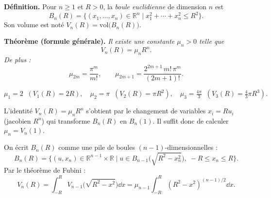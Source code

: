 ﻿%



\begin{tcolorbox}[thmbox]
  \textbf{Définition.}\enspace{}
  Pour $n \geq 1$ et $R > 0$, la \emph{boule euclidienne} de dimension $n$ est
  \[
    B_n(R) = \bigl\{(x_1,\ldots,x_n)\in\mathbb{R}^n \;\big|\; x_1^2+\cdots+x_n^2 \leq R^2\bigr\}.
  \]
  Son volume est noté $V_n(R) = \mathrm{vol}\bigl(B_n(R)\bigr)$.

  \medskip
  \textbf{Théorème (formule générale).}\enspace%
  \textit{Il existe une constante $\mu_n > 0$ telle que}
  \[
    V_n(R) = \mu_n R^n.
  \]
  \textit{De plus :}
  \[
    \mu_{2m} = \frac{\pi^m}{m!}, \qquad
    \mu_{2m+1} = \frac{2^{2m+1}\,m!\,\pi^m}{(2m+1)!}.
  \]
\end{tcolorbox}

\[
  \mu_1 = 2 \;\;(V_1(R)=2R),\quad
  \mu_2 = \pi \;\;(V_2(R)=\pi R^2),\quad
  \mu_3 = \tfrac{4\pi}{3} \;\;(V_3(R)=\tfrac{4}{3}\pi R^3).
\]

L'identité $V_n(R) = \mu_n R^n$ s'obtient par le changement de variables
$x_i = R u_i$ (jacobien $R^n$) qui transforme $B_n(R)$ en $B_n(1)$.
Il suffit donc de calculer $\mu_n = V_n(1)$.

\decsep{}


On écrit $B_n(R)$ comme une pile de boules $(n{-}1)$-di\-men\-sion\-nelles :
\[
  B_n(R) = \bigl\{(u, x_n)\in\mathbb{R}^{n-1}\times\mathbb{R} \;\big|\;
  u \in B_{n-1}\!\bigl(\sqrt{R^2-x_n^2}\bigr),\; -R \leq x_n \leq R\bigr\}.
\]
Par le théorème de Fubini%
 :
\[
  V_n(R) = \int_{-R}^{R} V_{n-1}\!\bigl(\sqrt{R^2-x^2}\bigr)\dd x
          = \mu_{n-1}\int_{-R}^{R}{(R^2-x^2)}^{(n-1)/2}\dd x.
\]

